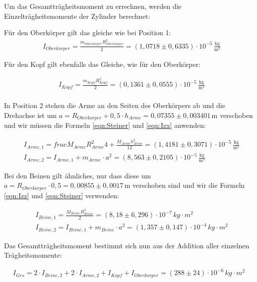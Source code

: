 Um das Gesamtträgheitsmoment zu errechnen, werden die Einzelträgheitsmomente der Zylinder berechnet:

Für den Oberkörper gilt das gleiche wie bei Position 1:
\begin{align*}
  & I_{Oberk\ddot{o}rper} = \frac{m_{Oberk\ddot{o}rper}R_{Oberk\ddot{o}rper}^2}{2} = (1{,}0718 \pm 0{,}6335) \cdot 10^{-5} \, \mathrm{\frac{kg}{m^3}}
\end{align*}

Für den Kopf gilt ebenfalls das Gleiche, wie für den Oberkörper:

\begin{align*}
  & I_{Kopf} = \frac{m_{Kopf}R_{Kopf}^2}{2} = (0{,}1361 \pm 0{,}0555) \cdot 10^{-5} \, \mathrm{\frac{kg}{m^3}}
\end{align*}
\\
In Position 2 stehen die Arme an den Seiten des Oberkörpers ab und die Drehachse ist um $a = R_{Oberk\ddot{o}rper} + 0,5 \cdot h_{Arme} = 0{,}07355 \pm 0{,}003401 \, \mathrm{m}$
verschoben und wir müssen die Formeln \ref{eqn:Steiner} und \ref{eqn:Izx} anwenden:

\begin{align*}
  & I_{Arme,1} = frac{M_{Arme}R_{Arme}^2}{4} + \frac{M_{Arme}h_{Arme}^2}{12} = (1{,}4181 \pm 0{,}3071) \cdot 10^{-5} \, \mathrm{\frac{kg}{m^3}} \\
  & I_{Arme,2} = I_{Arme,1} + m_{Arme} \cdot a^2 = (8{,}563 \pm 0{,}2105) \cdot 10^{-5} \, \mathrm{\frac{kg}{m^3}}
\end{align*}

Bei den Beinen gilt ähnliches, nur dass diese um $a = R_{Oberk\ddot{o}rper} \cdot 0{,}5 = 0{,}00855 \pm 0{,}0017 \, \mathrm{m}$ verschoben sind
und wir die Formeln \ref{eqn:Izz} und \ref{eqn:Steiner} verwenden:

\begin{align*}
  & I_{Beine,1} = \frac{M_{Beine}R_{Beine}^2}{2} = (8,18 \pm 6,296) \cdot 10^{-7} \, kg \cdot m^2 \\
  & I_{Beine,2} = I_{Beine,1} + m_{Beine} \cdot a^2 = (1,357 \pm 0,147) \cdot 10^{-4} \, kg \cdot m^2
\end{align*}

Das Gesamtträgheitsmoment bestimmt sich nun aus der Addition aller einzelnen Trägheitsmomente:

\begin{align}
  I_{Ges} = 2 \cdot I_{Beine,2} + 2 \cdot I_{Arme,2} + I_{Kopf} + I_{Oberk\ddot{o}rper} = (288 \pm 24)\cdot 10^{-6} \, kg \cdot m^2
\end{align}

